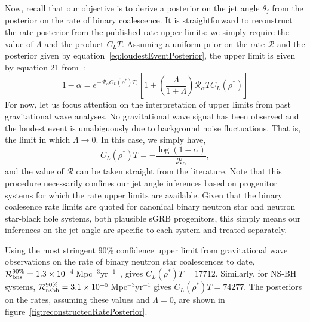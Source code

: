 \documentclass[twocolumn,nofootinbib]{revtex4}
\newcommand{\gw}{gravitational wave }
\newcommand{\cbcrate}{{{\mathcal R}}}
\newcommand{\diff}{{\mathrm d}}
\newcommand{\rhostar}{{\rho^*}}
\begin{document}
Now, recall that our objective is to derive a posterior on the jet angle
$\theta_j$ from the posterior on the rate of binary coalescence.  It is
straightforward to reconstruct the rate posterior from the published rate upper
limits: we simply require the value of $\Lambda$ and the product
$C_L T$.  
%
%
%
Assuming a uniform prior on the rate $\cbcrate$ and
the posterior given by equation~\ref{eq:loudestEventPosterior}, the upper limit
is given by equation 21 from~\cite{BradyFairhurst08}:
\begin{equation}
1-\alpha =  e^{-\cbcrate_{\alpha} C_L(\rhostar)T)}
\left[ 
1+ \left(\frac{\Lambda}{1+\Lambda}\right) \cbcrate_{\alpha} T C_L(\rhostar)
\right ]
\label{eq:rateIntegral}
\end{equation}
%
For now, let us focus attention on the interpretation of upper limits
from past \gw analyses.  No \gw signal has been observed and the loudest
event is umabiguously due to background noise fluctuations.  That is, the limit
in which $\Lambda \rightarrow 0$.  In this case, we simply have,
\begin{equation}
C_L(\rhostar)T = -\frac{\log(1-\alpha)}{\cbcrate_{\alpha}},
\end{equation}
and the value of $\cbcrate$ can be taken straight from the literature.  Note
that this procedure necessarily confines our jet angle inferences based on
progenitor systems for which the rate upper limits are available.  Given that
the binary coalesence rate limits are quoted for canonical binary neutron star
and neutron star-black hole systems, both plausible sGRB progenitors, this
simply means our inferences on the jet angle are specific to each system and
treated separately.

Using the most stringent 90\% confidence upper limit from \gw observations on the
rate of binary neutron star coalescences to date,
$\cbcrate^{90\%}_{{\rm bns}} = 1.3\times
10^{-4}$\,Mpc$^{-3}$yr$^{-1}$~\cite{S6lowmass}, gives $C_L(\rhostar)T=17712$.
Similarly, for NS-BH systems,  $\cbcrate^{90\%}_{{\rm nsbh}} = 3.1\times
10^{-5}$\,Mpc$^{-3}$yr$^{-1}$ gives $C_L(\rhostar)T=74277$.  The posteriors on
the rates, assuming these values and $\Lambda=0$, are shown in
figure~\ref{fig:reconstructedRatePosterior}.  
\end{document}
